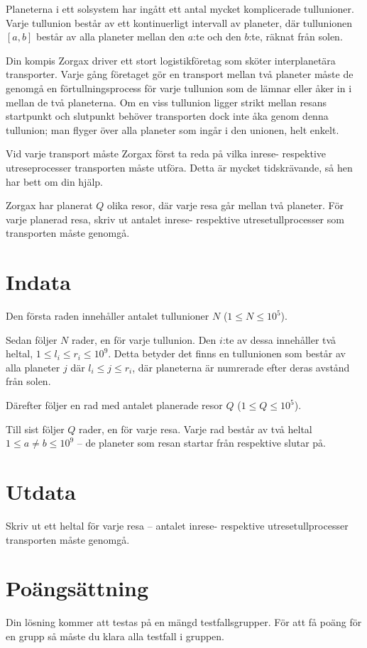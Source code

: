 Planeterna i ett solsystem har ingått ett antal mycket komplicerade tullunioner.
Varje tullunion består av ett kontinuerligt intervall av planeter, där tullunionen $[a, b]$ består av alla planeter mellan den $a$:te och den $b$:te, räknat från solen.

Din kompis Zorgax driver ett stort logistikföretag som sköter interplanetära transporter.
Varje gång företaget gör en transport mellan två planeter måste de genomgå en förtullningsprocess för varje tullunion som de lämnar eller åker in i mellan de två planeterna.
Om en viss tullunion ligger strikt mellan resans startpunkt och slutpunkt behöver transporten dock inte åka genom denna tullunion; man flyger över alla planeter som ingår i den unionen, helt enkelt.

Vid varje transport måste Zorgax först ta reda på vilka inrese- respektive utreseprocesser transporten måste utföra.
Detta är mycket tidskrävande, så hen har bett om din hjälp.

Zorgax har planerat $Q$ olika resor, där varje resa går mellan två planeter.
För varje planerad resa, skriv ut antalet inrese- respektive utresetullprocesser som transporten måste genomgå. 


\section*{Indata}
Den första raden innehåller antalet tullunioner $N$ ($1 \le N \le 10^5$).

Sedan följer $N$ rader, en för varje tullunion.
Den $i$:te av dessa innehåller två heltal, $1 \le l_i \leq r_i \le 10^9$.
Detta betyder det finns en tullunionen som består av alla planeter $j$ där $l_i \leq j \leq r_i$, där planeterna är numrerade efter deras avstånd från solen.

Därefter följer en rad med antalet planerade resor $Q$ ($1 \le Q \le 10^5$).

Till sist följer $Q$ rader, en för varje resa.
Varje rad består av två heltal $1 \le a \neq b \le 10^9$ -- de planeter som resan startar från respektive slutar på.

\section*{Utdata}
Skriv ut ett heltal för varje resa -- antalet inrese- respektive utresetullprocesser transporten måste genomgå.

\section*{Poängsättning}
Din lösning kommer att testas på en mängd testfallsgrupper.
För att få poäng för en grupp så måste du klara alla testfall i gruppen.

